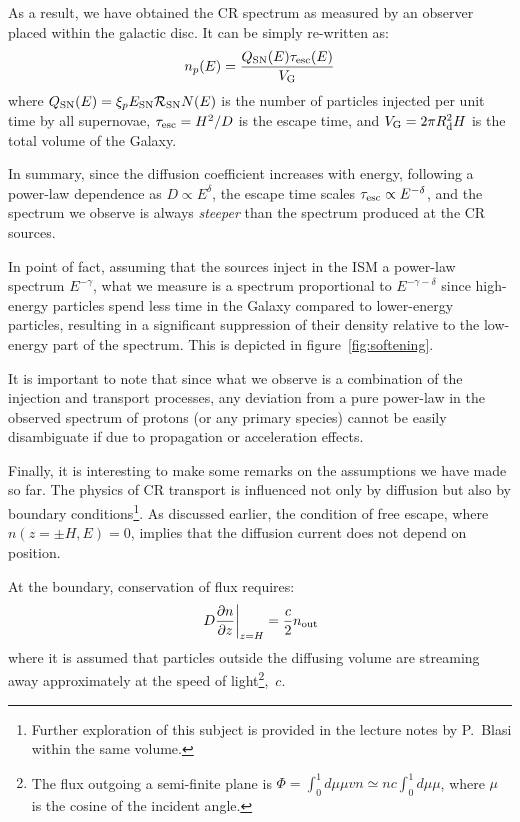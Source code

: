 As a result, we have obtained the CR spectrum as measured by an observer placed within the galactic disc.
%
It can be simply re-written as:
%
\begin{equation}
n_p(E) = \frac{Q_{\rm SN}(E) \tau_{\rm esc}(E)}{V_{\rm G}}
\end{equation}
%
where $Q_{\rm SN}(E) = \xi_p E_{\rm SN} \mathcal R_{\rm SN} N(E)$ is the number of particles injected per unit time by all supernovae, $\tau_{\rm esc} = H^2/D$ is the escape time, and $V_{\rm G} = 2\pi R_{\rm d}^2H$ is the total volume of the Galaxy.

In summary, since the diffusion coefficient increases with energy, following a power-law dependence as $D \propto E^{\delta}$, the escape time scales $\tau_{\rm esc} \propto E^{-\delta}$, and the spectrum we observe is always \emph{steeper} than the spectrum produced at the CR sources.

In point of fact, assuming that the sources inject in the ISM a power-law spectrum $E^{-\gamma}$, what we measure is a spectrum proportional to $E^{-\gamma-\delta}$ since high-energy particles spend less time in the Galaxy compared to lower-energy particles, resulting in a significant suppression of their density relative to the low-energy part of the spectrum.
%
This is depicted in figure~\ref{fig:softening}. 

It is important to note that since what we observe is a combination of the injection and transport processes, any deviation from a pure power-law in the observed spectrum of protons (or any primary species) cannot be easily disambiguate if due to propagation or acceleration effects. 

Finally, it is interesting to make some remarks on the assumptions we have made so far.  
%
The physics of CR transport is influenced not only by diffusion but also by boundary conditions\footnote{Further exploration of this subject is provided in the lecture notes by P.~Blasi within the same volume.}.
%
As discussed earlier, the condition of free escape, where $n(z = \pm H, E) = 0$, implies that the diffusion current does not depend on position.

At the boundary, conservation of flux requires:
%
\begin{equation}
\left. D \frac{\partial n}{\partial z} \right|_{z=H} = \frac{c}{2} n_{\rm out} %
\end{equation}
%
where it is assumed that particles outside the diffusing volume are streaming away approximately at the speed of light\footnote{The flux outgoing a semi-finite plane is $\Phi = \int_0^1 d\mu \mu v n \simeq n c \int_0^1 d\mu \mu$, where $\mu$ is the cosine of the incident angle.},~$c$.

